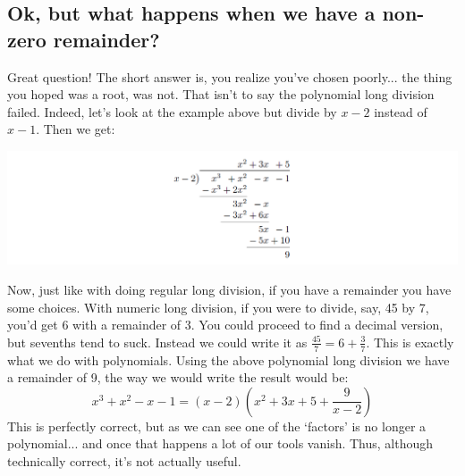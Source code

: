 \documentclass{ximeraXloud}
\begin{document}
    
    \subsection*{Ok, but what happens when we have a non-zero remainder?}
    
        Great question! The short answer is, you realize you've chosen poorly... the thing you hoped was a root, was not. That isn't to say the polynomial long division failed. Indeed, let's look at the example above but divide by $x-2$ instead of $x-1$. Then we get:
        
        \begin{image}
            \includegraphics[width=\textwidth]{exPolyLongDivisionTwo.png}
        \end{image}
        
        
        Now, just like with doing regular long division, if you have a remainder you have some choices. With numeric long division, if you were to divide, say, 45 by 7, you'd get 6 with a remainder of 3. You could proceed to find a decimal version, but sevenths tend to suck. Instead we could write it as $\frac{45}{7} = 6 + \frac{3}{7}$. This is exactly what we do with polynomials. Using the above polynomial long division we have a remainder of 9, the way we would write the result would be:
        \[
            x^3 + x^2 - x - 1 = (x - 2)\left(x^2 + 3x + 5 + \dfrac{9}{x-2}\right)
        \]
        This is perfectly correct, but as we can see one of the `factors' is no longer a polynomial... and once that happens a lot of our tools vanish. Thus, although technically correct, it's not actually useful.
    
\end{document}

